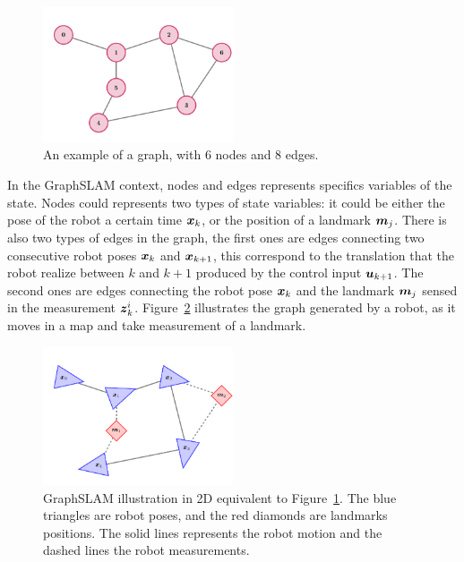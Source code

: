 \begin{figure}[htbp!]
    \centering
    \includegraphics[width=0.5\textwidth]{tikz/graph.pdf}
    \caption[An example of a graph]{An example of a graph, with 6 nodes and 8 edges.}
    \label{fig:graph}
\end{figure}  

In the GraphSLAM context, nodes and edges represents specifics variables of the state. Nodes could represents two types of state variables: it could be either the pose of the robot a certain time $\boldsymbol{x}_k$, or the position of a landmark $\boldsymbol{m}_j$. There is also two types of edges in the graph, the first ones are edges connecting two consecutive robot poses $\boldsymbol{x}_k$ and $\boldsymbol{x}_{k+1}$, this correspond to the translation that the robot realize between $k$ and $k+1$ produced by the control input $\boldsymbol{u}_{k+1}$. The second ones are edges connecting the robot pose $\boldsymbol{x}_k$ and the landmark $\boldsymbol{m}_j$ sensed in the measurement $\boldsymbol{z}_k^i$. Figure~\ref{fig:graphslam} illustrates the graph generated by a robot, as it moves in a map and take measurement of a landmark.

\begin{figure}[htbp!]
    \centering
    \includegraphics[width=0.5\textwidth]{tikz/graphslam.pdf}
    \caption[GraphSLAM ilustration in 2D]{GraphSLAM illustration in 2D equivalent to Figure~\ref{fig:graph}. The blue triangles are robot poses, and the red diamonds are landmarks positions. The solid lines represents the robot motion and the dashed lines the robot measurements.}
    \label{fig:graphslam}
\end{figure} 

